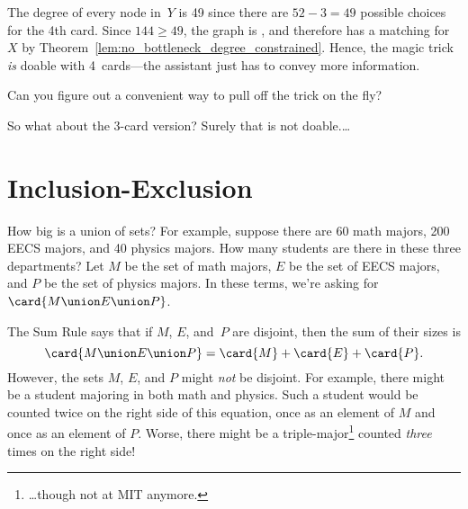 \begin{editingnotes}
The degree of every node in~$Y$ is 49 since there are $52 - 3 = 49$
possible choices for the 4th card.  Since $144 \ge 49$, the graph is
, and therefore has a matching for~$X$ by
Theorem~\ref{lem:no_bottleneck_degree_constrained}.
Hence, the magic trick \emph{is} doable with 4~cards---the assistant
just has to convey more information.  


Can you figure out a convenient
way to pull off the trick on the fly?

So what about the 3-card version?  Surely that is not doable.\dots
\end{editingnotes}

\begin{problems}

\practiceproblems
{}

\classproblems
{}

\homeworkproblems
{}

\examproblems
{}

\end{problems}



\section{Inclusion-Exclusion}\label{inc-ex_sec}

How big is a union of sets?  For example, suppose there are 60 math
majors, 200 EECS majors, and 40 physics majors.  How many students are
there in these three departments?  Let $M$ be the set of math majors,
$E$ be the set of EECS majors, and $P$ be the set of physics majors.  In
these terms, we're asking for $\card{M \union E \union P}$.

The Sum Rule says that if $M$, $E$, and~$P$ are disjoint, then the sum
of their sizes is
%
\[
\card{M \union E \union P} = \card{M} + \card{E} + \card{P} .
\]
%
However, the sets $M$, $E$, and $P$ might \emph{not} be disjoint.  For
example, there might be a student majoring in both math and
physics.  Such a student would be counted twice on the right side of this
equation, once as an element of $M$ and once as an element of $P$.  Worse,
there might be a triple-major\footnote{\dots though not at MIT anymore.}
counted \emph{three} times on the right side!

